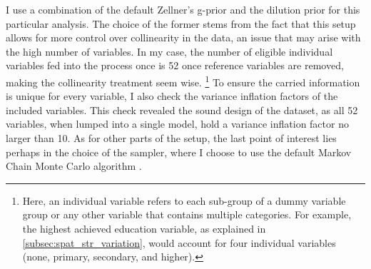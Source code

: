 I use a combination of the default Zellner's g-prior and the dilution prior for this particular analysis. The choice of the former stems from the fact that this setup allows for more control over collinearity in the data, an issue that may arise with the high number of variables. In my case, the number of eligible individual variables fed into the process once is 52 once reference variables are removed, making the collinearity treatment seem wise. \footnote{Here, an individual variable refers to each sub-group of a dummy variable group or any other variable that contains multiple categories. For example, the highest achieved education variable, as explained in \autoref{subsec:spat_str_variation}, would account for four individual variables (none, primary, secondary, and higher).} To ensure the carried information is unique for every variable, I also check the variance inflation factors of the included variables. This check revealed the sound design of the dataset, as all 52 variables, when lumped into a single model, hold a variance inflation factor no larger than 10. As for other parts of the setup, the last point of interest lies perhaps in the choice of the sampler, where I choose to use the default Markov Chain Monte Carlo algorithm \citep{zeugner2015bayesian}.

